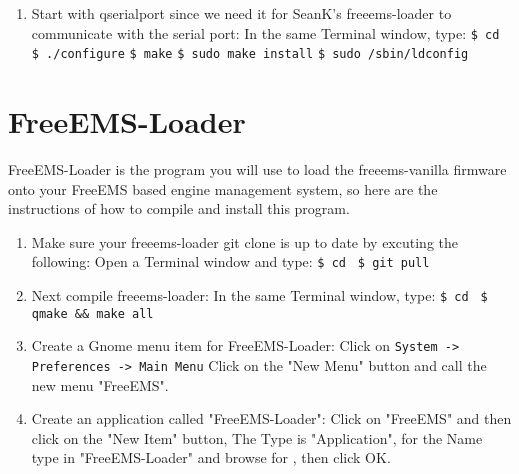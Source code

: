 \documentclass[12pt,notitlepage,onecolumn,oneside,openany]{memoir}
\begin{document}
\begin{enumerate}
\item \textsf{Start with qserialport since we need it for SeanK's freeems-loader to communicate with the serial port:} \newline
      \textsf{In the same Terminal window, type:} \newline
      \texttt{\$ cd }  \newline
      \texttt{\$ ./configure} \newline
      \texttt{\$ make} \newline
      \texttt{\$ sudo make install} \newline
      \texttt{\$ sudo /sbin/ldconfig} \newline
\end{enumerate}

\chapter{\textsf{FreeEMS-Loader}}

\textsf{FreeEMS-Loader is the program you will use to load the freeems-vanilla firmware onto your FreeEMS based engine management system, so here are the instructions of how to compile and install this program.} \newline

\begin{enumerate}
\item \textsf{Make sure your freeems-loader git clone is up to date by excuting the following:} \newline
      \textsf{Open a Terminal window and type:} \newline
      \texttt{\$ cd }  \newline
      \texttt{\$ git pull}

\item \textsf{Next compile freeems-loader:} \newline
      \textsf{In the same Terminal window, type:} \newline
      \texttt{\$ cd }  \newline
      \texttt{\$ qmake \&\& make all}

\item \textsf{Create a Gnome menu item for FreeEMS-Loader:} \newline
      \textsf{Click on } \texttt{System -> Preferences -> Main Menu} \newline
      \textsf{Click on the "New Menu" button and call the new menu "FreeEMS".}

\item \textsf{Create an application called "FreeEMS-Loader":} \newline
      \textsf{Click on "FreeEMS" and then click on the "New Item" button,} \newline
      \textsf{The Type is "Application", for the Name type in "FreeEMS-Loader" and browse for} \newline
       \textsf{, then click OK.}
\end{enumerate}
\end{document}
